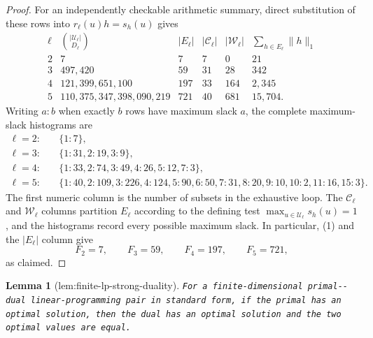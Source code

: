 \documentclass{article}
\newtheorem{lemma}{Lemma}
\begin{document}
\begin{proof}
For an independently checkable arithmetic summary, direct substitution of these rows into \(r_\ell(u)h=s_h(u)\) gives
\[
\begin{array}{c|r|r|r|r|r}
\ell&\binom{|\mathcal U_\ell|}{D_\ell}&|E_\ell|&|\mathcal C_\ell|&|\mathcal W_\ell|&
\sum_{h\in E_\ell}\|h\|_1\\ \hline
2&7&7&7&0&21\\
3&497{,}420&59&31&28&342\\
4&121{,}399{,}651{,}100&197&33&164&2{,}345\\
5&110{,}375{,}347{,}398{,}090{,}219&721&40&681&15{,}704.
\end{array}
\]
Writing \(a:b\) when exactly \(b\) rows have maximum slack \(a\), the complete maximum-slack histograms are
\[
\begin{aligned}
\ell=2:&\quad \{1:7\},\\
\ell=3:&\quad \{1:31,2:19,3:9\},\\
\ell=4:&\quad \{1:33,2:74,3:49,4:26,5:12,7:3\},\\
\ell=5:&\quad \{1:40,2:109,3:226,4:124,5:90,6:50,7:31,8:20,9:10,10:2,11:16,15:3\}.
\end{aligned}
\]
The first numeric column is the number of subsets in the exhaustive loop.  The \(\mathcal C_\ell\) and \(\mathcal W_\ell\) columns partition \(E_\ell\) according to the defining test \(\max_{u\in\mathcal U_\ell}s_h(u)=1\), and the histograms record every possible maximum slack.  In particular, (1) and the \(|E_\ell|\) column give
\[
F_2=7,\qquad F_3=59,\qquad F_4=197,\qquad F_5=721,
\]
as claimed.
\end{proof}

\begin{lemma}[lem:finite-lp-strong-duality]\label{lem:finite-lp-strong-duality}
\texttt{For a finite-\allowbreak{}dimensional primal-\allowbreak{}-\allowbreak{}dual linear-\allowbreak{}programming pair in standard form,\allowbreak{} if the primal has an optimal solution,\allowbreak{} then the dual has an optimal solution and the two optimal values are equal.}
\end{lemma}
\end{document}
